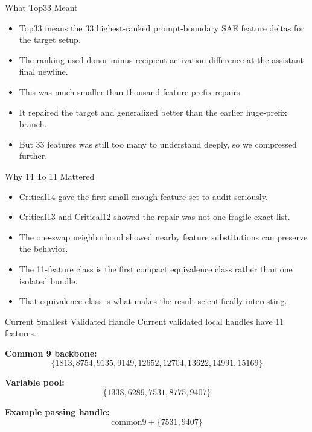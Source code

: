 \documentclass[aspectratio=169]{beamer}
\begin{document}
\begin{frame}{What Top33 Meant}
\small
\begin{itemize}
  \item Top33 means the 33 highest-ranked prompt-boundary SAE feature deltas for the target setup.
  \item The ranking used donor-minus-recipient activation difference at the assistant final newline.
  \item This was much smaller than thousand-feature prefix repairs.
  \item It repaired the target and generalized better than the earlier huge-prefix branch.
  \item But 33 features was still too many to understand deeply, so we compressed further.
\end{itemize}
\end{frame}

\begin{frame}{Why 14 To 11 Mattered}
\small
\begin{itemize}
  \item Critical14 gave the first small enough feature set to audit seriously.
  \item Critical13 and Critical12 showed the repair was not one fragile exact list.
  \item The one-swap neighborhood showed nearby feature substitutions can preserve the behavior.
  \item The 11-feature class is the first compact equivalence class rather than one isolated bundle.
  \item That equivalence class is what makes the result scientifically interesting.
\end{itemize}
\end{frame}

\begin{frame}{Current Smallest Validated Handle}
\small
Current validated local handles have 11 features.

\vspace{0.4em}
\textbf{Common 9 backbone:}
\[
\{1813,8754,9135,9149,12652,12704,13622,14991,15169\}
\]

\textbf{Variable pool:}
\[
\{1338,6289,7531,8775,9407\}
\]

\textbf{Example passing handle:}
\[
\mathrm{common9}+\{7531,9407\}
\]

\end{frame}
\end{document}
